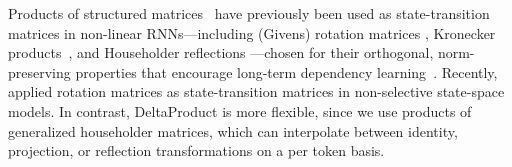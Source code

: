 Products of structured matrices~\citep{kissel2023structured} have previously been used as state-transition matrices in non-linear RNNs—including (Givens) rotation matrices \citep{Dorobantu2016DizzyRNNRR, jing-icml17a, dangovski2019rotational}, Kronecker products~\citep{jose-icml18a}, and Householder reflections \citep{mhammedi-icml17a}—chosen for their orthogonal, norm-preserving properties that encourage long-term dependency learning~\citep{hochreiter1991untersuchungen, bengio1994learning}. Recently, \citet{biegun2024rotrnn} applied rotation matrices as state-transition matrices in non-selective state-space models. In contrast, DeltaProduct is more flexible, since we use products of generalized householder matrices, which can interpolate between identity, projection, or reflection transformations on a per token basis.